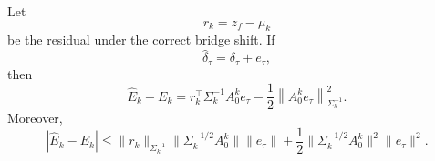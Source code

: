 \begin{proposition}
\label{prop:energy-perturbation-appendix}
Let
\begin{equation}
    r_k
    =
    z_f-\mu_k
\end{equation}
be the residual under the correct bridge shift. If
\[
    \widehat{\delta}_{\tau}
    =
    \delta_{\tau}
    +
    e_{\tau},
\]
then
\begin{equation}
    \widehat{E}_k - E_k
    =
    r_k^\top \Sigma_k^{-1}A_0^k e_{\tau}
    -
    \frac{1}{2}
    \left\|
    A_0^k e_{\tau}
    \right\|_{\Sigma_k^{-1}}^2 .
    \label{eq:energy-perturbation-appendix}
\end{equation}
Moreover,
\begin{equation}
    |\widehat{E}_k - E_k|
    \le
    \|r_k\|_{\Sigma_k^{-1}}
    \|\Sigma_k^{-1/2}A_0^k\|
    \|e_{\tau}\|
    +
    \frac{1}{2}
    \|\Sigma_k^{-1/2}A_0^k\|^2
    \|e_{\tau}\|^2 .
    \label{eq:energy-error-bound-appendix}
\end{equation}
\end{proposition}

